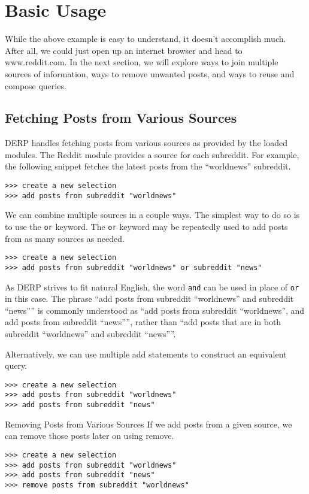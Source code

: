 \section{Basic Usage}
While the above example is easy to understand, it doesn’t accomplish much. After all, we could just open up an internet browser and head to www.reddit.com.
In the next section, we will explore ways to join multiple sources of information, ways to remove unwanted posts, and ways to reuse and compose queries.

\subsection{Fetching Posts from Various Sources}

DERP handles fetching posts from various sources as provided by the loaded modules. The Reddit module provides a source for each subreddit. For example,
the following snippet fetches the latest posts from the “worldnews” subreddit.
\newline\begin{minipage}{\linewidth}\begin{lstlisting}
>>> create a new selection
>>> add posts from subreddit "worldnews"
\end{lstlisting}\end{minipage}
We can combine multiple sources in a couple ways. The simplest way to do so is to use the \texttt{or} keyword. The \texttt{or} keyword may be repeatedly used to add posts
from as many sources as needed.
\newline\begin{minipage}{\linewidth}\begin{lstlisting}
>>> create a new selection
>>> add posts from subreddit "worldnews" or subreddit "news"
\end{lstlisting}\end{minipage}
As DERP strives to fit natural English, the word \texttt{and} can be used in place of \texttt{or} in this case. The phrase “add posts from subreddit “worldnews” and
subreddit “news”” is commonly understood as “add posts from subreddit “worldnews”, and add posts from subreddit “news””, rather than “add posts that
are in both subreddit “worldnews” and subreddit “news””.

Alternatively, we can use multiple add statements to construct an equivalent query.
\newline\begin{minipage}{\linewidth}\begin{lstlisting}
>>> create a new selection
>>> add posts from subreddit "worldnews"
>>> add posts from subreddit "news"
\end{lstlisting}\end{minipage}
Removing Posts from Various Sources
If we add posts from a given source, we can remove those posts later on using remove.
\newline\begin{minipage}{\linewidth}\begin{lstlisting}
>>> create a new selection
>>> add posts from subreddit "worldnews"
>>> add posts from subreddit "news"
>>> remove posts from subreddit "worldnews"
\end{lstlisting}\end{minipage}
